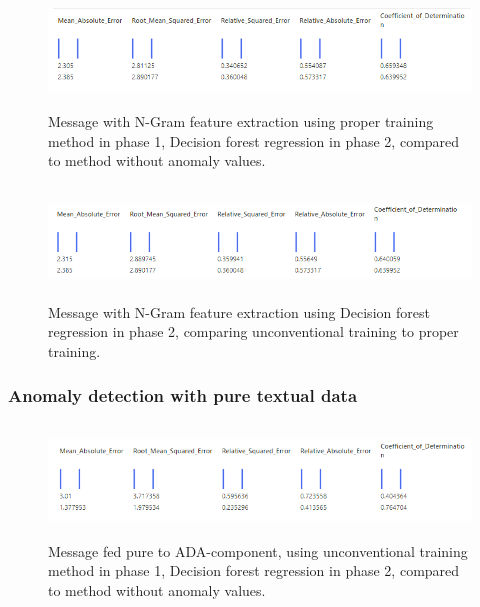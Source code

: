\begin{figure}[htb]
    \centering
    \includegraphics[height=30mm,scale=0.5]{./appendices/msg_ngram_decision-forest-reg_proper2unanom.png}
    \caption{Message with N-Gram feature extraction
    using proper training method in phase 1,
        Decision forest regression in phase 2,
        compared to method without anomaly values.
        \label{fig:msg_ngram_decision-forest-reg_proper2unanom}}
\end{figure}

\begin{figure}[htb]
    \centering
    \includegraphics[height=30mm,scale=0.5]{./appendices/msg_ngram_decision-forest-reg_lewd2proper.png}
    \caption{Message with N-Gram feature extraction
    using Decision forest regression in phase 2,
        comparing unconventional training to proper training.
        \label{fig:msg_ngram_decision-forest-reg_lewd2proper}}
\end{figure}



\clearpage

\subsubsection*{Anomaly detection with pure textual data}

\begin{figure}[htb]
    \centering
    \includegraphics[height=30mm,scale=0.5]{./appendices/msg_pure_decision-forest-reg_lewd2unanom.png}
    \caption{Message fed pure to ADA-component,
    using unconventional training method in phase 1,
        Decision forest regression in phase 2,
        compared to method without anomaly values.
        \label{fig:msg_pure_decision-forest-reg_lewd2unanom}}
\end{figure}

